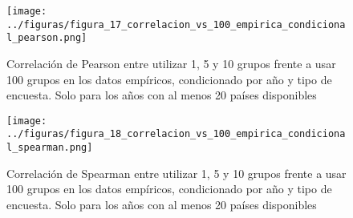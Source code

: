 \begin{figure}[H] %
    \centering %
    \texttt{[image: ../figuras/figura\_17\_correlacion\_vs\_100\_empirica\_condicional\_pearson.png]} %
    \caption{Correlación de Pearson entre utilizar 1, 5 y 10 grupos frente a usar 100 grupos en los datos empíricos, condicionado por año y tipo de encuesta. Solo para los años con al menos 20 países disponibles}
    \label{fig:17} %
\end{figure}

\begin{figure}[H] %
    \centering %
    \texttt{[image: ../figuras/figura\_18\_correlacion\_vs\_100\_empirica\_condicional\_spearman.png]} %
    \caption{Correlación de Spearman entre utilizar 1, 5 y 10 grupos frente a usar 100 grupos en los datos empíricos, condicionado por año y tipo de encuesta. Solo para los años con al menos 20 países disponibles}
    \label{fig:18} %
\end{figure}

